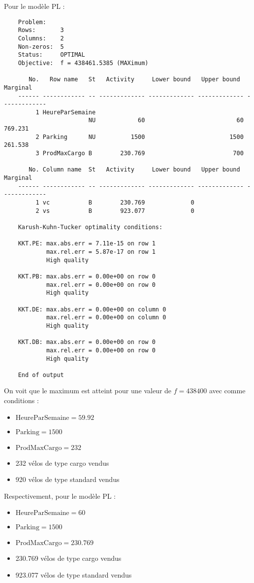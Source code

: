 Pour le modèle PL :

\begin{lstlisting}
    Problem:    
    Rows:       3
    Columns:    2
    Non-zeros:  5
    Status:     OPTIMAL
    Objective:  f = 438461.5385 (MAXimum)
    
       No.   Row name   St   Activity     Lower bound   Upper bound    Marginal
    ------ ------------ -- ------------- ------------- ------------- -------------
         1 HeureParSemaine
                        NU            60                          60       769.231 
         2 Parking      NU          1500                        1500       261.538 
         3 ProdMaxCargo B        230.769                         700 
    
       No. Column name  St   Activity     Lower bound   Upper bound    Marginal
    ------ ------------ -- ------------- ------------- ------------- -------------
         1 vc           B        230.769             0               
         2 vs           B        923.077             0               
    
    Karush-Kuhn-Tucker optimality conditions:
    
    KKT.PE: max.abs.err = 7.11e-15 on row 1
            max.rel.err = 5.87e-17 on row 1
            High quality
    
    KKT.PB: max.abs.err = 0.00e+00 on row 0
            max.rel.err = 0.00e+00 on row 0
            High quality
    
    KKT.DE: max.abs.err = 0.00e+00 on column 0
            max.rel.err = 0.00e+00 on column 0
            High quality
    
    KKT.DB: max.abs.err = 0.00e+00 on row 0
            max.rel.err = 0.00e+00 on row 0
            High quality
    
    End of output
\end{lstlisting}  

On voit que le maximum est atteint pour une valeur de $f=438400$ avec comme conditions :
\begin{itemize}
\item $\text{HeureParSemaine} = 59.92$
\item $\text{Parking} = 1500$
\item $\text{ProdMaxCargo} = 232$
\item 232 vélos de type cargo vendus
\item 920 vélos de type standard vendus
\end{itemize}
Respectivement, pour le modèle PL :
\begin{itemize}
\item $\text{HeureParSemaine} = 60$
\item $\text{Parking} = 1500$
\item $\text{ProdMaxCargo} = 230.769$
\item 230.769 vélos de type cargo vendus
\item 923.077 vélos de type standard vendus
\end{itemize}

